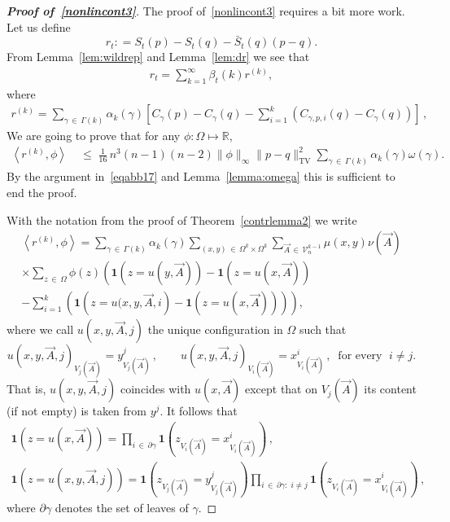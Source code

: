 \documentclass[AHL,Unicode,longabstracts,published]{cedram}
\renewcommand{\leq}{\;\leqslant\;}
\newcommand{\tv}{\mathrm{TV}}
\newcommand{\ind}{\mathbf{1}}
\newcommand{\cV}{\mathcal{V}}
\newcommand{\bbR}{\mathbb{R}}
\let\b=\beta
\let\g=\gamma
\let\o=\omega
\begin{document}
\begin{proof}[{\bf Proof of~\eqref{nonlincont3}}]
The proof of~\eqref{nonlincont3} requires a bit more work.
Let us define
\[
r_t: = S_t(p) - S_t(q) - \bar{S}_t(q)(p-q).
\]
From Lemma~\ref{lem:wildrep} and Lemma~\ref{lem:dr} we see that
\begin{align}\label{eqa17}
r_t=\sum_{k=1}^\infty \b_t(k) r^{(k)},
\end{align}
where
\begin{align}\label{eqaa17}
r^{(k)}=\sum_{\gamma\,\in\,\Gamma(k)}\alpha_k(\gamma)\left[C_{\gamma}(p)-C_{\gamma}(q)-\sum_{i=1}^k\left(C_{\gamma,p,i}(q)-C_{\gamma}(q)\right)\right]\,,
\end{align}
We are going to prove that for any $\phi:\Omega\mapsto\bbR$,
\begin{align}\label{eq27}
\left\langle r^{(k)},\phi\right\rangle &
\leq \tfrac1{16}\,n^3(n-1)(n-2)\|\phi\|_\infty \|p-q\|^2_{\tv}\sum_{\gamma\,\in\,\Gamma(k)}\alpha_k(\gamma)\o(\g).
\end{align}
By the argument in~\eqref{eqabb17} and Lemma~\ref{lemma:omega} this is sufficient to end the proof.

With the notation from the proof of Theorem~\ref{contrlemma2} we write
\begin{multline}\label{eq28}
\left\langle r^{(k)},\phi\right\rangle=\sum_{\gamma\,\in\,\Gamma(k)}\alpha_k(\gamma)
\sum_{(x,y)\,\in\,\Omega^k\times \Omega^k}\sum_{\vec A\,\in\,\cV_n^{k-1}}\mu(x,y)\nu(\vec A)  \\
\times \sum_{z\,\in\,\Omega} \phi(z)\left(\ind\left(z=u(y,\vec A)\right)-\ind\left(z=u(x,\vec A)\right) 
\right.\\
\left. - \sum_{i=1}^k\left(\ind\left(z=u(x,y,\vec A,i\right) -\ind\left(z=u(x,\vec A)\right) \right)\right),
\end{multline}
where we call $u(x,y,\vec A,j)$ the unique configuration in $\Omega$ such that
\[
u(x,y,\vec A,j)_{V_j(\vec A)} = y^j_{V_j(\vec A)}\,,\qquad u(x,y,\vec A,j)_{V_i(\vec A)} = x^i_{V_i(\vec A)}\,,\;\;\text{for every }\; i\neq j.
\]
That is, $u(x,y,\vec A,j)$ coincides with $u(x,\vec A)$ except that on $V_j(\vec A)$ its content (if not empty) is taken from $y^j$.
It follows that
\begin{gather*}
\ind\left(z=u(x,\vec A)\right) =
\prod_{i\,\in\,\partial \g}
\ind\left(z_{V_i(\vec A)}=x^i_{V_i(\vec A)}\right)\,,\\
\ind\left(z=u\left(x,y,\vec A,j\right)\right) =\ind\left(z_{V_j(\vec A)}=y^j_{V_j(\vec A)}\right)
\prod_{i\,\in\,\partial \g:\; i\neq j}
\ind\left(z_{V_i(\vec A)}=x^i_{V_i(\vec A)}\right)\,,
\end{gather*}
where $\partial\g$ denotes the set of leaves of $\g$.


\end{proof}
\end{document}
